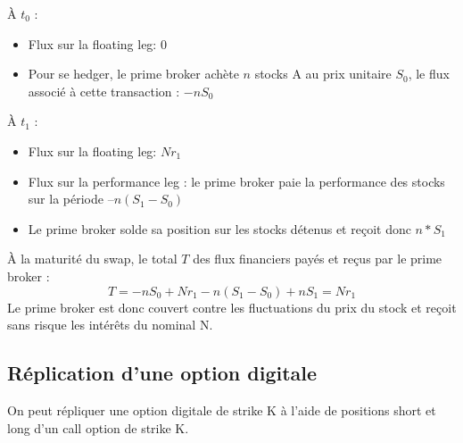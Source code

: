 \documentclass[a4paper]{article}
\begin{document}
À $t_0$ :
\begin{itemize}
    \item Flux sur la floating leg: $0$ 
    \item Pour se hedger, le prime broker achète $n$ stocks A au prix unitaire $S_0$, le flux associé à cette transaction : $-n S_0$ 
\end{itemize}
À $t_1$ : 
\begin{itemize}
    \item Flux sur la floating leg: $N r_1$ 
    \item Flux sur la performance leg : le prime broker paie la performance des stocks sur la période $–n (S_1-S_0)$ 
    \item Le prime broker solde sa position sur les stocks détenus et reçoit donc $n*S_1$ 
\end{itemize}
À la maturité du swap, le total $T$ des flux financiers payés et reçus par le prime broker :  
\begin{equation}
    T = -n S_0 + N r_1 - n (S_1-S_0) + n S_1 = N r_1     
\end{equation}
Le prime broker est donc couvert contre les fluctuations du prix du stock et reçoit sans risque les intérêts du nominal N. 

\subsection{Réplication d'une option digitale}

On peut répliquer une option digitale de strike K à l'aide de positions short et long d'un call option de strike K. 
\end{document}
